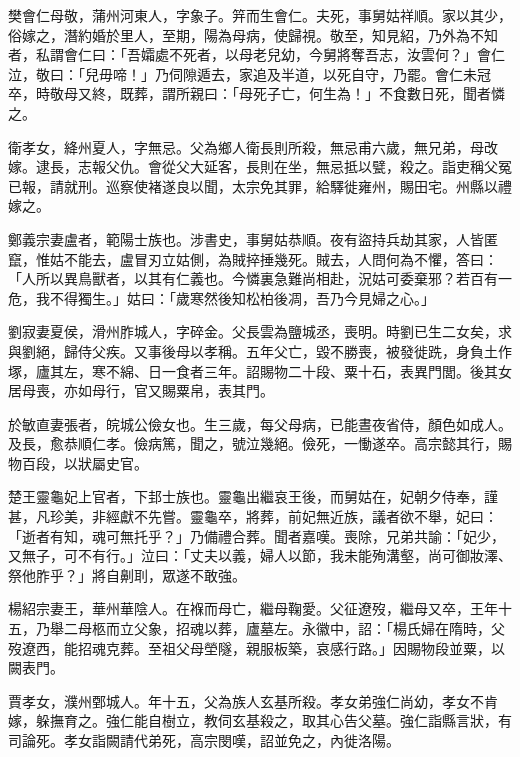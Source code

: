 \begin{pinyinscope}
 樊會仁母敬，蒲州河東人，字象子。笄而生會仁。夫死，事舅姑祥順。家以其少，俗嫁之，潛約婚於里人，至期，陽為母病，使歸視。敬至，知見紹，乃外為不知者，私謂會仁曰：「吾孀處不死者，以母老兒幼，今舅將奪吾志，汝雲何？」會仁泣，敬曰：「兒毋啼！」乃伺隙遁去，家追及半道，以死自守，乃罷。會仁未冠卒，時敬母又終，既葬，謂所親曰：「母死子亡，何生為！」不食數日死，聞者憐之。



 衛孝女，絳州夏人，字無忌。父為鄉人衛長則所殺，無忌甫六歲，無兄弟，母改嫁。逮長，志報父仇。會從父大延客，長則在坐，無忌抵以甓，殺之。詣吏稱父冤已報，請就刑。巡察使褚遂良以聞，太宗免其罪，給驛徙雍州，賜田宅。州縣以禮嫁之。



 鄭義宗妻盧者，範陽士族也。涉書史，事舅姑恭順。夜有盜持兵劫其家，人皆匿竄，惟姑不能去，盧冒刃立姑側，為賊捽捶幾死。賊去，人問何為不懼，答曰：「人所以異鳥獸者，以其有仁義也。今憐裏急難尚相赴，況姑可委棄邪？若百有一危，我不得獨生。」姑曰：「歲寒然後知松柏後凋，吾乃今見婦之心。」



 劉寂妻夏侯，滑州胙城人，字碎金。父長雲為鹽城丞，喪明。時劉已生二女矣，求與劉絕，歸侍父疾。又事後母以孝稱。五年父亡，毀不勝喪，被發徙跣，身負土作塚，廬其左，寒不綿、日一食者三年。詔賜物二十段、粟十石，表異門閭。後其女居母喪，亦如母行，官又賜粟帛，表其門。



 於敏直妻張者，皖城公儉女也。生三歲，每父母病，已能晝夜省侍，顏色如成人。及長，愈恭順仁孝。儉病篤，聞之，號泣幾絕。儉死，一慟遂卒。高宗懿其行，賜物百段，以狀屬史官。



 楚王靈龜妃上官者，下邽士族也。靈龜出繼哀王後，而舅姑在，妃朝夕侍奉，謹甚，凡珍美，非經獻不先嘗。靈龜卒，將葬，前妃無近族，議者欲不舉，妃曰：「逝者有知，魂可無托乎？」乃備禮合葬。聞者嘉嘆。喪除，兄弟共諭：「妃少，又無子，可不有行。」泣曰：「丈夫以義，婦人以節，我未能殉溝壑，尚可御妝澤、祭他胙乎？」將自劓刵，眾遂不敢強。



 楊紹宗妻王，華州華陰人。在褓而母亡，繼母鞠愛。父征遼歿，繼母又卒，王年十五，乃舉二母柩而立父象，招魂以葬，廬墓左。永徽中，詔：「楊氏婦在隋時，父歿遼西，能招魂克葬。至祖父母塋隧，親服板築，哀感行路。」因賜物段並粟，以闕表門。



 賈孝女，濮州鄄城人。年十五，父為族人玄基所殺。孝女弟強仁尚幼，孝女不肯嫁，躲撫育之。強仁能自樹立，教伺玄基殺之，取其心告父墓。強仁詣縣言狀，有司論死。孝女詣闕請代弟死，高宗閔嘆，詔並免之，內徙洛陽。




\end{pinyinscope}
